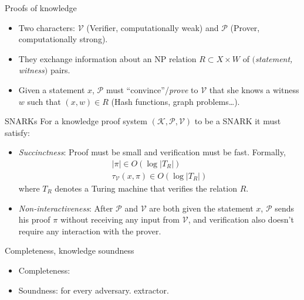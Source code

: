 


\frame{\titlepage}

\begin{frame}{Proofs of knowledge}
	\begin{itemize}
		\item Two characters: $\mathcal{V}$ (Verifier, computationally weak)
			and $\mathcal{P}$ (Prover, computationally strong).
		\item They exchange information about an NP relation $R \subset
			X \times W$ of $($\emph{statement, witness}$)$ pairs.
		\item Given a statement $x$, $\mathcal{P}$ must
			``convince''/\emph{prove} to $\mathcal{V}$ that she knows
			a witness $w$ such that $(x,w) \in R$ (Hash functions,
			graph problems\ldots).
	\end{itemize}
\end{frame}

\begin{frame}{SNARKs}
	For a knowledge proof system $(\mathcal{K}, \mathcal{P}, \mathcal{V})$ to be
	a SNARK it must satisfy:
	\begin{itemize}
		\item \emph{Succinctness}: Proof must be small and verification
			must be fast. Formally,
			\[
				\begin{array}{c}
					|\pi| \in O(\log |T_R|)\\
					\tau_{\mathcal{V}}(x, \pi) \in O(\log |T_R|)
				\end{array}
			\]
			where $T_R$ denotes a Turing machine that verifies the
			relation $R$.
		\item \emph{Non-interactiveness}: After $\mathcal{P}$ and $\mathcal{V}$
			are both given the statement $x$, $\mathcal{P}$ sends his
			proof $\pi$ without receiving any input from $\mathcal{V}$,
			and verification also doesn't require any interaction with
			the prover.
	\end{itemize}
\end{frame}

\begin{frame}{Completeness, knowledge soundness}
	\begin{itemize}
		\item Completeness:
		\item Soundness: for every adversary. extractor.
	\end{itemize}
\end{frame}


